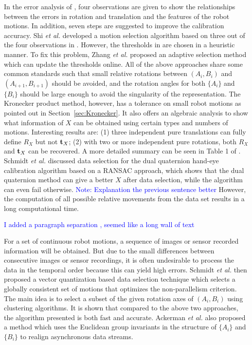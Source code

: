 \documentclass[twocolumn,10pt]{asme2ej}
\newcommand{\ttt}{{\bf t}}
\begin{document}
In the error analysis of \cite{tsai1989new}, four observations are given to show the relationships between the errors in rotation and translation and the features of the robot motions. In addition, seven steps are suggested to improve the calibration accuracy. Shi {\it{et al.}} \cite{shi2005approach} developed a motion selection algorithm based on three out of the four observations in \cite{tsai1989new}. However, the thresholds in \cite{shi2005approach} are chosen in a heuristic manner. To fix this problem,  Zhang {\it{et al.}} \cite{zhang2005adaptive} proposed an adaptive selection method which can update the thresholds online. All of the above approaches share some common standards such that small relative rotations between $(A_i, B_i)$ and $(A_{i+1}, B_{i+1})$ should be avoided, and the rotation angles for both $\{A_i\}$ and $\{B_i\}$ should be large enough to avoid the singularity of the representation. The Kronecker product method, however, has a tolerance on small robot motions as pointed out in Section~\ref{sec:Kronecker}. It also offers an algebraic analysis to show what information of $X$ can be obtained using certain types and numbers of motions. Interesting results are: (1) three independent pure translations can fully define $R_X$ but not $\ttt_{X}$; (2) with two or more independent pure rotations, both $R_{X}$ and $\ttt_{X}$ can be recovered. A more detailed summary can be seen in Table 1 of \cite{andreff1999line}. Schmidt {\it{et al.}} \cite{schmidt2003robust} discussed data selection for the dual quaternion hand-eye calibration algorithm based on a RANSAC approach, which shows that the dual quaternion method can give a better $X$ after data selection, while the algorithm can even fail otherwise. \textcolor{blue}{Note: Explanation the previous sentence better} However, the computation of all possible relative movements from the data set results in a long computational time. 

\textcolor{blue}{I added a paragraph separation , seemed like a long wall of text}

For a set of continuous robot motions, a sequence of images or sensor recorded information will be obtained. But due to the small differences between consecutive images or sensor recordings, it is often undesirable to process the data in the temporal order because this can yield high errors. Schmidt {\it{et al.}} \cite{vogt2004vector} then proposed a vector quantization based data selection technique which selects a globally consistent set of motions that optimizes the non-parallelism criterion. The main idea is to select a subset of the given rotation axes of $(A_i, B_i)$ using clustering algorithms. It is shown that compared to the above two approaches, the algorithm presented is both fast and accurate. Ackerman {\it{et al.}} \cite{ackermanIROS2013} also proposed a method which uses the Euclidean group invariants in the structure of $\{A_i\}$ and $\{B_i\}$ to realign asynchronous data streams.
\end{document}
